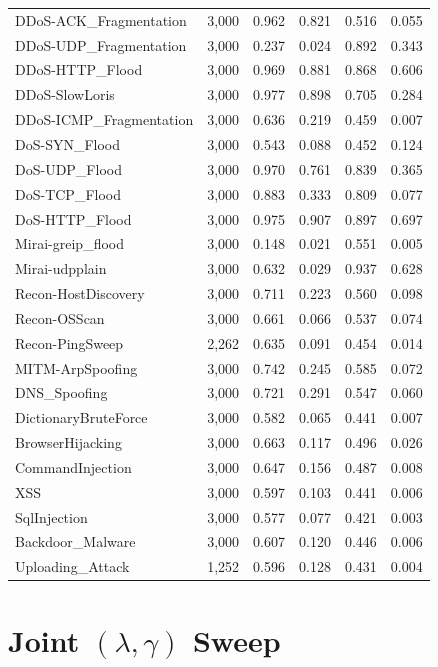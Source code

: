 \documentclass[journal]{IEEEtran}
\begin{document}
\begin{table}[!htb]
{\begin{tabular}{lrcccc}
DDoS-ACK\_Fragmentation & 3{,}000 & 0.962 & 0.821 & 0.516 & 0.055 \\
DDoS-UDP\_Fragmentation & 3{,}000 & 0.237 & 0.024 & 0.892 & 0.343 \\
DDoS-HTTP\_Flood & 3{,}000 & 0.969 & 0.881 & 0.868 & 0.606 \\
DDoS-SlowLoris & 3{,}000 & 0.977 & 0.898 & 0.705 & 0.284 \\
DDoS-ICMP\_Fragmentation & 3{,}000 & 0.636 & 0.219 & 0.459 & 0.007 \\
DoS-SYN\_Flood & 3{,}000 & 0.543 & 0.088 & 0.452 & 0.124 \\
DoS-UDP\_Flood & 3{,}000 & 0.970 & 0.761 & 0.839 & 0.365 \\
DoS-TCP\_Flood & 3{,}000 & 0.883 & 0.333 & 0.809 & 0.077 \\
DoS-HTTP\_Flood & 3{,}000 & 0.975 & 0.907 & 0.897 & 0.697 \\
Mirai-greip\_flood & 3{,}000 & 0.148 & 0.021 & 0.551 & 0.005 \\
Mirai-udpplain & 3{,}000 & 0.632 & 0.029 & 0.937 & 0.628 \\
Recon-HostDiscovery & 3{,}000 & 0.711 & 0.223 & 0.560 & 0.098 \\
Recon-OSScan & 3{,}000 & 0.661 & 0.066 & 0.537 & 0.074 \\
Recon-PingSweep & 2{,}262 & 0.635 & 0.091 & 0.454 & 0.014 \\
MITM-ArpSpoofing & 3{,}000 & 0.742 & 0.245 & 0.585 & 0.072 \\
DNS\_Spoofing & 3{,}000 & 0.721 & 0.291 & 0.547 & 0.060 \\
DictionaryBruteForce & 3{,}000 & 0.582 & 0.065 & 0.441 & 0.007 \\
BrowserHijacking & 3{,}000 & 0.663 & 0.117 & 0.496 & 0.026 \\
CommandInjection & 3{,}000 & 0.647 & 0.156 & 0.487 & 0.008 \\
XSS & 3{,}000 & 0.597 & 0.103 & 0.441 & 0.006 \\
SqlInjection & 3{,}000 & 0.577 & 0.077 & 0.421 & 0.003 \\
Backdoor\_Malware & 3{,}000 & 0.607 & 0.120 & 0.446 & 0.006 \\
Uploading\_Attack & 1{,}252 & 0.596 & 0.128 & 0.431 & 0.004 \\
\bottomrule
\end{tabular}}
\end{table}

\section{Joint \texorpdfstring{$(\lambda,\gamma)$}{(lambda,gamma)} Sweep}
\label{sec:lambdagamma}
\end{document}
